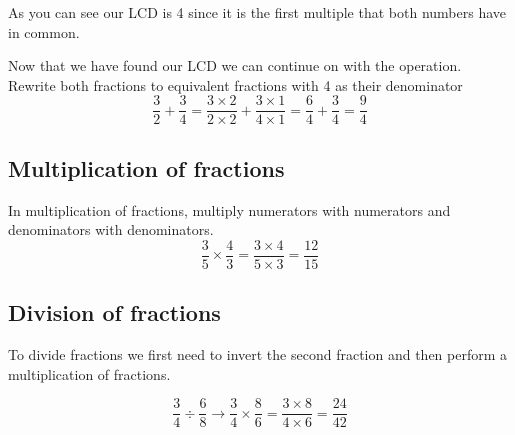 \documentclass[11pt]{article}
\begin{document}
As you can see our LCD is 4 since it is the first multiple that both numbers have in common.  

Now that we have found our LCD we can continue on with the operation. Rewrite both fractions to equivalent fractions with 4 as their denominator
$$\frac{3}{2}+\frac{3}{4} = \frac{3\times2}{2\times2} + \frac{3\times1}{4\times1} = \frac{6}{4} + \frac{3}{4} = \frac{9}{4}$$

\subsection{Multiplication of fractions}
In multiplication of fractions, multiply numerators with numerators and denominators with denominators.
$$\frac{3}{5}\times\frac{4}{3} = \frac{3\times4}{5\times3} = \frac{12}{15}$$

\subsection{Division of fractions}
To divide fractions we first need to invert the second fraction and then perform a multiplication of fractions.

$$\frac{3}{4}\div\frac{6}{8} \to \frac{3}{4}\times\frac{8}{6} = \frac{3\times8}{4\times6} = \frac{24}{42}$$  
\end{document}

